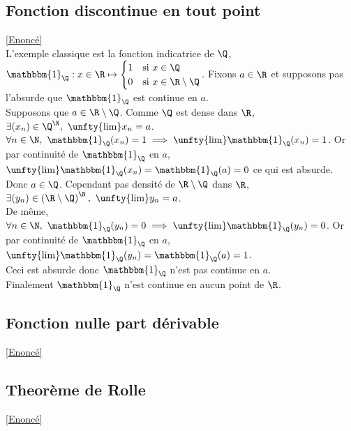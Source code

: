 \documentclass{book}
\begin{document}
	\subsection{Fonction discontinue en tout point }\label{sec:fonction-discontinue-en-tout-point-etoile1}
	\textcolor{blue}{\hyperref[discontinuetoutpoint]{[Enoncé]}}\\
	L'exemple classique est la fonction indicatrice de $\Q$, $\mathbbm{1}_\Q:x\in \R\mapsto \begin{cases}1&\mbox{si }x\in \Q\\0&\mbox{si }x\in \R\setminus\Q\end{cases}$. Fixons $a\in \R$ et supposons pas l'absurde que $\mathbbm{1}_\Q$ est continue en $a$.\\
	Supposons que $a\in \R\setminus\Q$. Comme $\Q$ est dense dans $\R$, $\exists (x_n)\in \Q^\N,\ \unfty{\lim}x_n=a$.\\
	$\forall n\in \N,\ \mathbbm{1}_\Q(x_n)=1\implies \unfty{\lim}\mathbbm{1}_\Q(x_n)=1$. Or par continuité de $\mathbbm{1}_\Q$ en $a$, $\unfty{\lim}\mathbbm{1}_\Q(x_n)=\mathbbm{1}_\Q(a)=0$ ce qui est absurde.\\
	Donc $a\in \Q$. Cependant pas densité de $\R\setminus\Q$ dans $\R$, $\exists (y_n)\in \left(\R\setminus\Q\right)^\N,\ \unfty{\lim}y_n=a$.\\
	De même, $\forall n\in \N,\ \mathbbm{1}_\Q(y_n)=0\implies \unfty{\lim}\mathbbm{1}_\Q(y_n)=0$. Or par continuité de $\mathbbm{1}_\Q$ en $a$, $\unfty{\lim}\mathbbm{1}_\Q(y_n)=\mathbbm{1}_\Q(a)=1$.\\
	Ceci est absurde donc $\mathbbm{1}_\Q$ n'est pas continue en $a$.\\
	Finalement $\mathbbm{1}_\Q$ n'est continue en aucun point de $\R$.
	
	\subsection{Fonction nulle part dérivable}
	\label{sec:fonction-nulle-part-derivable}
	\textcolor{blue}{\hyperref[nullepartdérivable]{[Enoncé]}}\\
	
	\subsection{Theorème de Rolle}
	\label{sec:theoreme-de-rolle}
	\textcolor{blue}{\hyperref[Théorème de Rolle]{[Enoncé]}}\\
	
\end{document}
